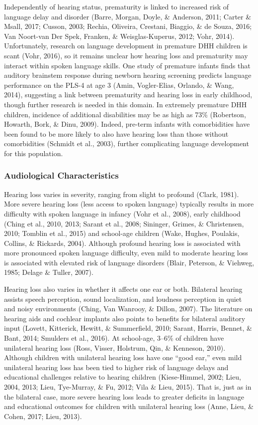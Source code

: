 \documentclass[english,man]{apa6}
\begin{document}
Independently of hearing status, prematurity is linked to increased risk of language delay and disorder (Barre, Morgan, Doyle, \& Anderson, 2011; Carter \& Msall, 2017; Cusson, 2003; Rechia, Oliveira, Crestani, Biaggio, \& de Souza, 2016; Van Noort-van Der Spek, Franken, \& Weisglas-Kuperus, 2012; Vohr, 2014). Unfortunately, research on language development in premature DHH children is scant (Vohr, 2016), so it remains unclear how hearing loss and prematurity may interact within spoken language skills. One study of premature infants finds that auditory brainstem response during newborn hearing screening predicts language performance on the PLS-4 at age 3 (Amin, Vogler-Elias, Orlando, \& Wang, 2014), suggesting a link between prematurity and hearing loss in early childhood, though further research is needed in this domain. In extremely premature DHH children, incidence of additional disabilities may be as high as 73\% (Robertson, Howarth, Bork, \& Dinu, 2009). Indeed, pre-term infants with comorbidities have been found to be more likely to also have hearing loss than those without comorbidities (Schmidt et al., 2003), further complicating language development for this population.

\hypertarget{audiological-characteristics}{%
\subsubsection{Audiological Characteristics}\label{audiological-characteristics}}

Hearing loss varies in severity, ranging from slight to profound (Clark, 1981). More severe hearing loss (less access to spoken language) typically results in more difficulty with spoken language in infancy (Vohr et al., 2008), early childhood (Ching et al., 2010, 2013; Sarant et al., 2008; Sininger, Grimes, \& Christensen, 2010; Tomblin et al., 2015) and school-age children (Wake, Hughes, Poulakis, Collins, \& Rickards, 2004). Although profound hearing loss is associated with more pronounced spoken language difficulty, even mild to moderate hearing loss is associated with elevated risk of language disorders (Blair, Peterson, \& Viehweg, 1985; Delage \& Tuller, 2007).

Hearing loss also varies in whether it affects one ear or both. Bilateral hearing assists speech perception, sound localization, and loudness perception in quiet and noisy environments (Ching, Van Wanrooy, \& Dillon, 2007). The literature on hearing aids and cochlear implants also points to benefits for bilateral auditory input (Lovett, Kitterick, Hewitt, \& Summerfield, 2010; Sarant, Harris, Bennet, \& Bant, 2014; Smulders et al., 2016). At school-age, 3--6\% of children have unilateral hearing loss (Ross, Visser, Holstrum, Qin, \& Kenneson, 2010). Although children with unilateral hearing loss have one \enquote{good ear,} even mild unilateral hearing loss has been tied to higher risk of language delays and educational challenges relative to hearing children (Kiese-Himmel, 2002; Lieu, 2004, 2013; Lieu, Tye-Murray, \& Fu, 2012; Vila \& Lieu, 2015). That is, just as in the bilateral case, more severe hearing loss leads to greater deficits in language and educational outcomes for children with unilateral hearing loss (Anne, Lieu, \& Cohen, 2017; Lieu, 2013).
\end{document}
